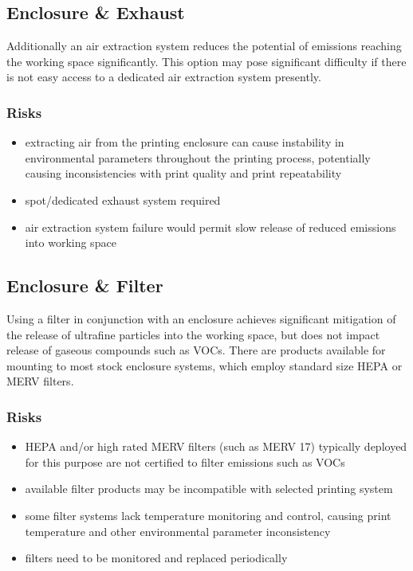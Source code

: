 \documentclass[11pt]{article}
\begin{document}
\subsection{Enclosure \& Exhaust}
\label{sec:org7098f1e}
Additionally an air extraction system reduces the potential of emissions reaching the working space significantly. This option may pose significant difficulty if there is not easy access to a dedicated air extraction system presently.

\subsubsection{Risks}
\label{sec:orgf325c37}
\begin{itemize}
\item extracting air from the printing enclosure can cause instability in environmental parameters throughout the printing process, potentially causing inconsistencies with print quality and print repeatability
\item spot/dedicated exhaust system required
\item air extraction system failure would permit slow release of reduced emissions into working space
\end{itemize}

\subsection{Enclosure \& Filter}
\label{sec:org818d824}
Using a filter in conjunction with an enclosure achieves significant mitigation of the release of ultrafine particles into the working space, but does not impact release of gaseous compounds such as VOCs. There are products available for mounting to most stock enclosure systems, which employ standard size HEPA or MERV filters.

\subsubsection{Risks}
\label{sec:orgce2bd76}
\begin{itemize}
\item HEPA and/or high rated MERV filters (such as MERV 17) typically deployed for this purpose are not certified to filter emissions such as VOCs
\item available filter products may be incompatible with selected printing system
\item some filter systems lack temperature monitoring and control, causing print temperature and other environmental parameter inconsistency
\item filters need to be monitored and replaced periodically
\end{itemize}
\end{document}
